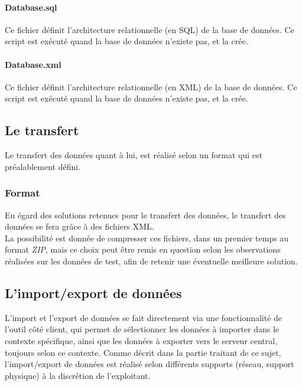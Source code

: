 \paragraph{Database.sql}
Ce fichier définit l'architecture relationnelle (en SQL) de la base de données.
Ce script est exécuté quand la base de données n'existe pas, et la crée.

\paragraph{Database.xml}
Ce fichier définit l'architecture relationnelle (en XML) de la base de données.
Ce script est exécuté quand la base de données n'existe pas, et la crée.

\subsection{Le transfert}
Le transfert des données quant à lui, est réalisé selon un format qui est préalablement défini.

\subsubsection{Format}
Eu égard des solutions retenues pour le transfert des données, le transfert des données se fera grâce à des fichiers XML. \\
La possibilité est donnée de compresser ces fichiers, dans un premier temps au format \emph{ZIP}, mais ce choix peut être remis en question selon les observations réalisées sur les données de test, afin de retenir une éventuelle meilleure solution.

% 
% 

\subsection{L'import/export de données}
L'import et l'export de données se fait directement via une fonctionnalité de l'outil côté client, qui permet de sélectionner les données à importer dans le contexte spécifique, ainsi que les données à exporter vers le serveur central, toujours selon ce contexte.
Comme décrit dans la partie traitant de ce sujet, l'import/export de données est réalisé selon différents supports (réseau, support physique) à la discrétion de l'exploitant.
